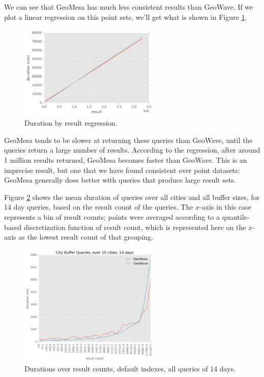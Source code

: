 We can see that GeoMesa has much less consistent results than GeoWave.
If we plot a linear regression on this point sets, we'll get what is shown in Figure \ref{durationbyresultreg}.

\begin{figure}[h!tb]
  \centering
  \includegraphics[width=0.60\textwidth]{../docs/img/gdelt/gdelt-result-over-duration-regression.png}
  \caption{Duration by result regression.}
  \label{durationbyresultreg}
\end{figure}

GeoMesa tends to be slower at returning these queries than GeoWave, until the queries return a large number of results.
According to the regression, after around 1 million results returned, GeoMesa becomes faster than GeoWave.
This is an imprecise result, but one that we have found consistent over point datasets: GeoMesa generally does better with queries that produce large result sets.

Figure \ref{durationresultall14} shows the mean duration of queries over all cities and all buffer sizes, for 14 day queries, based on the result count of the queries.
The $x$-axis in this case represents a bin of result counts;
points were averaged according to a quantile-based discretization function of result count,
which is represented here on the $x$-axis as the lowest result count of that grouping.

\begin{figure}[h!tb]
  \centering
  \includegraphics[width=0.60\textwidth]{../docs/img/gdelt/014-days-default.png}
  \caption{Durations over result counts, default indexes, all queries of 14 days.}
  \label{durationresultall14}
\end{figure}

